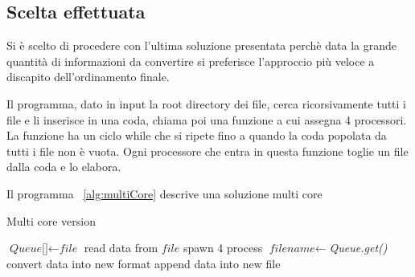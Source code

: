 \documentclass[../main.tex]{subfiles}
\begin{document}
\subsection{Scelta effettuata}

Si è scelto di procedere con l'ultima soluzione presentata perchè data la grande quantità di informazioni da convertire si preferisce l'approccio più veloce a discapito dell'ordinamento finale.

Il programma, dato in input la root directory dei file, cerca ricorsivamente tutti i file e li inserisce in una coda, chiama poi una funzione a cui assegna 4 processori. La funzione ha un ciclo while che si ripete fino a quando la coda popolata da tutti i file non è vuota. Ogni processore che entra in questa funzione toglie un file dalla coda e lo elabora.

Il programma ~\ref{alg:multiCore} descrive una soluzione multi core
\begin{algorithm}
\caption{Multi core version}
				\label{alg:multiCore}
\begin{algorithmic}[1]
\State $\textit{Queue[]} \gets \textit{file}$
\State read data from $\textit{file}$
\State spawn 4 process
\State $\textit{filename} \gets $\textit{Queue.get()}
\State convert data into new format
\State append data into new file
\EndWhile
\EndFor
\EndProcedure
\end{algorithmic}
\end{algorithm}
\end{document}
